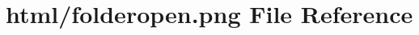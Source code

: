 \hypertarget{folderopen_8png}{}\section{html/folderopen.png File Reference}
\label{folderopen_8png}

